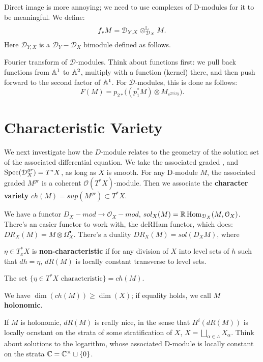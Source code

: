 Direct image is more annoying; we need to use complexes of D-modules for it to be meaningful. We define:
\[	f_* M = \mathcal{D}_{Y , X} \otimes^{\mathbb L}_{\mathcal{D}_X} M.	\]
Here $\mathcal{D}_{Y , X}$ is a $\mathcal{D}_Y - \mathcal{D}_X$ bimodule defined as follows. 


Fourier transform of $\mathcal{D}$-modules. Think about functions first: we pull back functions from $\mathbb A^1$ to
$\mathbb A^2$, multiply with a function (kernel) there, and then push forward to the second factor of $\mathbb A^1$.
For $\mathcal{D}$-modules, this is done as follows:
\[	F(M) = p_{2*} \big( (p_1^* M) \otimes M_{e^{2\pi i xy}} \big) . \]


\section{Characteristic Variety}
We next investigate how the $D$-module relates to the geometry of the solution set of the associated differential equation.
We take the associated graded , and $\operatorname{Spec} (\mathcal{D}_X^{gr}) = T^*X$, as long as $X$ is
smooth. For any D-module $M$, the associated graded $M^{gr}$ is a coherent $\mathcal{O}(T^*X)$-module. Then we associate
the \textbf{character variety} $ch(M) =  sup(M^{gr}) \subset T^*X$.

We have a functor $D_X -mod \to \mathcal{O}_X -mod$, $sol_X (M) = \mathbb R \operatorname{Hom}_{\mathcal{D}_X}(M,\mathcal{O}_X)$.
There's an easier functor to work with, the deRHam functor, which does: $DR_X(M) = M \otimes \Omega_X^{\bullet}$.
There's a duality $DR_X(M) = sol(D_X M)$, where 

\begin{defin}
$\eta \in T^*_x X$ is \textbf{non-characteristic} if for any division of $X$ into level sets of $h$ such that $dh = \eta$,
$dR(M)$ is locally constant transverse to level sets.
\end{defin}

\begin{thm}
The set $\{\eta \in T^*X \text{ characteristic}\} = ch(M)$.
\end{thm}

We have $\dim(ch(M)) \geq \dim(X)$; if equality holds, we call $M$ \textbf{holonomic}.

If $M$ is holonomic, $dR(M)$ is really nice, in the sense that $H^i(dR(M))$ is locally ocnstant on the strata of some 
stratification of $X$, $X = \bigsqcup_{\alpha \in \Lambda} X_{\alpha}$. Think about solutions to the logarithm,
whose associated D-module is locally constant on the strata $\mathbb C = \mathbb C^{\times} \sqcup \{0\}$.

